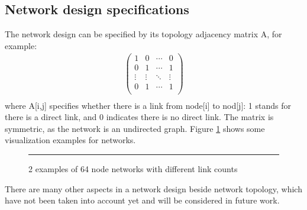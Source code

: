 \documentclass[12pt]{article}
\theoremstyle{definition}
\begin{document}
\subsection{Network design specifications}
The network design can be specified by its topology adjacency matrix A, for example:
\begin{align*}
  \begin{pmatrix}
    1 & 0 & \cdots & 0 \\
    0 & 1 & \cdots & 1 \\
    \vdots & \vdots & \ddots & \vdots \\
    0 & 1 & \cdots & 1 \\
  \end{pmatrix} \\
\end{align*}
where A[i,j] specifies whether there is a link from node[i] to nod[j]: 1 stands for there is a direct link, and 0 indicates there is no direct link. The matrix is symmetric, as the network is an undirected graph. Figure \ref{fig:networks} shows some visualization examples for networks.
\begin{figure}[htb]
  \centering
  \begin{subfigure}
    {\texttt{[image: graph3.png]}}
  \end{subfigure}
  \begin{subfigure}
    {\texttt{[image: graph4.png]}}
  \end{subfigure}
  \rule{1\linewidth}{1pt}
  \caption{2 examples of 64 node networks with different link counts}
  \label{fig:networks}
\end{figure}
There are many other aspects in a network design beside network topology, which have not been taken into account yet and will be considered in future work.
\end{document}
